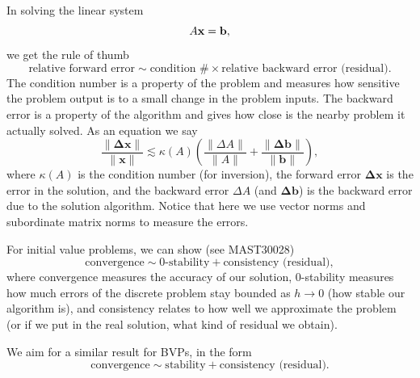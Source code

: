 \documentclass[12pt, a4paper]{article}
\theoremstyle{definition}
\theoremstyle{remark}
\numberwithin{equation}{section}
\begin{document}
In solving the linear system
\begin{equation*}
A {\mathbf x} = {\bf b},
\end{equation*}
we get the rule of thumb
\begin{equation*}
\mbox{relative forward error} \sim \mbox{condition \#} \times \mbox{relative backward error (residual)}.
\end{equation*}
The condition number is a property of the problem and measures how sensitive the problem output is to a small change in the problem inputs. The backward error is a property of the algorithm and gives how close is the nearby problem it actually solved. As an equation we say
\begin{equation*}
\label{ }
\frac{ \| \mathbf{\Delta x}\|}{\|\mathbf{x}\|} \lesssim \kappa(A)  \left(\frac{\| {\Delta A} \|}{\| { A} \|} + 
\frac{ \|\mathbf{\Delta b}\| }{\| \mathbf{ b} \| }\right),
\end{equation*}
where $\kappa(A)$ is the condition number (for inversion),  the forward error $\mathbf{\Delta x}$ is the error in the solution, and the backward error
${\Delta A}$ (and $\mathbf{\Delta b}$) is the backward error due to the solution algorithm. Notice that here we use vector norms and subordinate matrix norms to measure the errors. 

For initial value problems, we can show (see MAST30028)
\begin{equation*}
\mbox{convergence} \sim \mbox{0-stability} + \mbox{consistency (residual)},
\end{equation*}
where convergence measures the accuracy of our solution, 0-stability measures how much errors of the discrete problem stay bounded as $h \to 0$ (how stable our algorithm is), and consistency relates to how well we approximate the problem (or if we put in the real solution, what kind of residual we obtain).

We aim for a similar result for BVPs, in the form
\begin{equation*}
\mbox{convergence} \sim \mbox{stability} + \mbox{consistency (residual)}.
\end{equation*}
\end{document}
